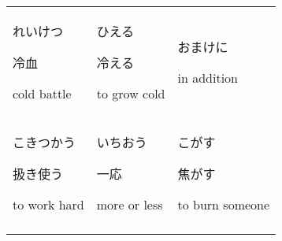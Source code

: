 \documentclass[12pt, a4j, landscape, dvipdfmx]{utarticle}
\begin{document}
\begin{minipage}[t][0pt]{\linewidth }
\begin{tabular}{||p{5.5cm}||p{5.5cm}||p{5.5cm}||}
            \rule{0pt}{3ex} \hspace*{-.4cm} {\LARGE
            れいけつ}\newline \rule{0pt}{3ex} \hspace*{.4cm}
            {\small 冷血}\newline \rule{0pt}{3ex}
            \hspace*{.425cm} {\small
            cold battle}&\rule{0pt}{3ex} \hspace*{-.4cm}
            {\LARGE ひえる}\newline \rule{0pt}{3ex}
            \hspace*{.4cm} {\small 冷える}\newline
            \rule{0pt}{3ex} \hspace*{.425cm} {\small
            to grow cold}&\rule{0pt}{3ex} \hspace*{-.4cm}
            {\LARGE おまけに}\newline \rule{0pt}{3ex}
            \hspace*{.4cm} {\small }\newline \rule{0pt}{3ex}
            \hspace*{.425cm} {\small
            in addition}\tabularnewline \hhline{|:=::=::=:|}
            \rule{0pt}{3ex} \hspace*{-.4cm} {\LARGE
            こきつかう}\newline \rule{0pt}{3ex} \hspace*{.4cm}
            {\small 扱き使う}\newline \rule{0pt}{3ex}
            \hspace*{.425cm} {\small
            to work hard}&\rule{0pt}{3ex} \hspace*{-.4cm}
            {\LARGE いちおう}\newline \rule{0pt}{3ex}
            \hspace*{.4cm} {\small 一応}\newline
            \rule{0pt}{3ex} \hspace*{.425cm} {\small
            more or less}&\rule{0pt}{3ex} \hspace*{-.4cm}
            {\LARGE こがす}\newline \rule{0pt}{3ex}
            \hspace*{.4cm} {\small 焦がす}\newline
            \rule{0pt}{3ex} \hspace*{.425cm} {\small
            to burn someone}\tabularnewline
            \hhline{|:=::=::=:|} \rule{0pt}{3ex}

\end{tabular}
\end{minipage}
\end{document}
